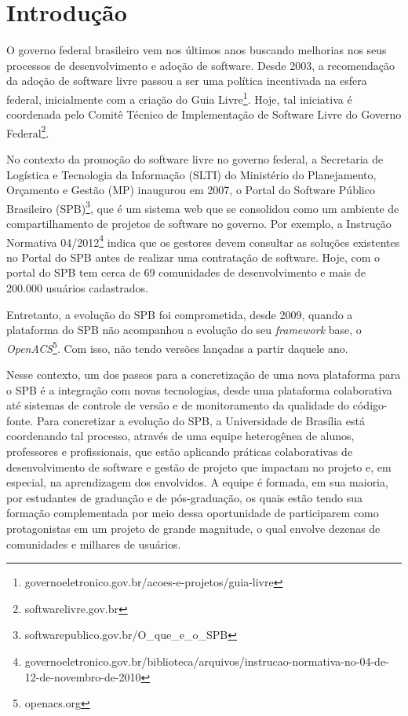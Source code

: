 \section{Introdução}
\label{sec:introducao}

O governo federal brasileiro vem nos últimos anos buscando melhorias nos
seus processos de desenvolvimento e adoção de software.
%
Desde 2003, a recomendação da adoção de software livre passou a ser uma política
incentivada na esfera federal, inicialmente com a criação do
Guia Livre\footnote{governoeletronico.gov.br/acoes-e-projetos/guia-livre}.
%
Hoje, tal iniciativa é coordenada pelo Comitê Técnico de Implementação de
Software Livre do Governo Federal\footnote{softwarelivre.gov.br}.


No contexto da promoção do software livre no governo federal, a
Secretaria de Logística e Tecnologia da Informação (SLTI) do Ministério do
Planejamento, Orçamento e Gestão (MP) inaugurou em 2007, o Portal do Software
Público Brasileiro (SPB)\footnote{softwarepublico.gov.br/O\_que\_e\_o\_SPB}, que é um sistema web que se consolidou como
um ambiente de compartilhamento de projetos de software no governo.
%
Por exemplo, a Instrução Normativa
04/2012\footnote{governoeletronico.gov.br/biblioteca/arquivos/instrucao-normativa-no-04-de-12-de-novembro-de-2010}
indica que os gestores devem consultar as soluções existentes no Portal do SPB
antes de realizar uma contratação de software.
%
Hoje, com o portal do SPB tem cerca de 69 comunidades de
desenvolvimento e mais de 200.000 usuários cadastrados.

Entretanto, a evolução do SPB foi comprometida, desde 2009, quando a plataforma
do SPB não acompanhou a evolução do seu \textit{framework} base,
o \emph{OpenACS}\footnote{openacs.org}.
%
Com isso, não tendo versões lançadas a partir daquele ano.

Nesse contexto, um dos passos para a concretização de uma nova plataforma para o
SPB é a integração com novas tecnologias, desde uma plataforma colaborativa até sistemas
de controle de versão e de monitoramento da qualidade do código-fonte.
%
Para concretizar a evolução do SPB, a Universidade de Brasília está coordenando
tal processo, através de uma equipe heterogênea de alunos, professores e
profissionais, que estão aplicando práticas colaborativas de desenvolvimento
de software e gestão de projeto que impactam no projeto e, em especial,
na aprendizagem dos envolvidos.
%
A equipe é formada, em sua maioria, por estudantes de graduação e de
pós-graduação, os quais estão tendo sua formação complementada por meio dessa
oportunidade de participarem como protagonistas em um projeto de grande
magnitude, o qual envolve dezenas de comunidades e milhares de usuários.



